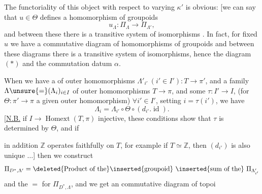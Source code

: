 The functoriality of this object with respect to
varying \(\kappa'\) is obvious: [we can say that
\(u\in\Theta\) defines a homomorphism of groupoids
\[
u_\Lambda:\Pi_\Lambda\longrightarrow\Pi_{\Lambda'},
\]
and between these
there is a transitive system of isomorphisms \unsure{\}}. In fact,
for fixed \(u\) we have a  commutative
diagram of homomorphisms of groupoids
and between these diagrams there is a
transitive system of isomorphisms, hence
the diagram \((*)\) and the commutation
datum \(\alpha\).

When we have a   of outer
homomorphisms \(\Lambda'_{i'}\ (i'\in I'):T\longrightarrow\pi'\), and a
family \(\Lambda\unsure{=}(\Lambda_i)_{i\in I}\) of outer homomorphisms \(T\longrightarrow\pi\), and some
\(\tau:I'\longrightarrow I\), 
(for \(\Theta:\pi'\longrightarrow\pi\) a given outer homomorphism)
\(\forall i'\in I'\), setting \(i=\tau(i')\), we have
\[
\Lambda_i=\Lambda_{i'}\circ\Theta\circ(d_{i'}.\operatorname{id}).
\]
[\uline{N.B.} if \(I\longrightarrow\operatorname{Homext}(T,\pi)\) injective, these conditions
show that \(\tau\) is determined by \(\Theta\), and if

in addition \(\mathbb Z\) operates faithfully on \(T\), for example
if \(T\simeq\mathbb Z\), then \((d_{i'})\) is also unique \(\ldots\)]
then we construct 
\[
\Pi_{D^*,\Lambda'}=
\deleted{\text{Product of the}}\inserted{\text{groupoid}}\ \inserted{\text{sum of the}}\ \Pi_{\Lambda'_{i'}}
\]
and the \(=\) for \(\Pi_{D^*,\Lambda}\), and we get an
commutative diagram of topoi

